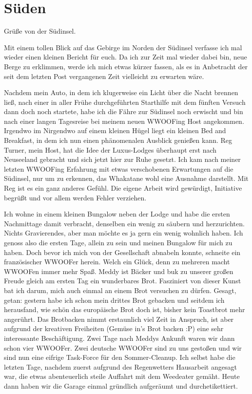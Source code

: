 \chapter{S\"uden}

Grüße von der Südinsel.

Mit einem tollen Blick auf das Gebirge im Norden der Südinsel verfasse
ich mal wieder einen kleinen Bericht für euch. Da ich zur Zeit mal
wieder dabei bin, neue Berge zu erklimmen, werde ich mich etwas kürzer
fassen, als es in Anbetracht der seit dem letzten Post vergangenen Zeit
vielleicht zu erwarten wäre.

Nachdem mein Auto, in dem ich klugerweise ein Licht über die Nacht
brennen ließ, nach einer in aller Frühe durchgeführten Starthilfe mit
dem fünften Versuch dann doch noch startete, habe ich die Fähre zur
Südinsel noch erwischt und bin nach einer langen Tagesreise bei meinem
neuen WWOOFing Host angekommen. Irgendwo im Nirgendwo auf einem kleinen
Hügel liegt ein kleinen Bed and Breakfast, in dem ich nun einen
phänomenalen Ausblick genießen kann. Reg Turner, mein Host, hat die Idee
der Luxus-Lodges überhaupt erst nach Neuseeland gebracht und sich jetzt
hier zur Ruhe gesetzt. Ich kam nach meiner letzten WWOOFing Erfahrung
mit etwas verschobenen Erwartungen auf die Südinsel, nur um zu erkennen,
das Whakatane wohl eine Ausnahme darstellt. Mit Reg ist es ein ganz
anderes Gefühl. Die eigene Arbeit wird gewürdigt, Initiative begrüßt und
vor allem werden Fehler verziehen.

Ich wohne in einem kleinen Bungalow neben der Lodge und habe die ersten
Nachmittage damit verbracht, denselben ein wenig zu säubern und
herzurichten. Nichts Gravierendes, aber man möchte es ja gern ein wenig
wohnlich haben. Ich genoss also die ersten Tage, allein zu sein und
meinen Bungalow für mich zu haben. Doch bevor ich mich von der
Gesellschaft abnabeln konnte, schneite ein französischer WWOOFer herein.
Welch ein Glück, denn zu mehreren macht WWOOFen immer mehr Spaß. Meddy
ist Bäcker und buk zu unserer großen Freude gleich am ersten Tag ein
wunderbares Brot. Fasziniert von dieser Kunst bat ich darum, mich auch
einmal an einem Brot versuchen zu dürfen. Gesagt, getan: gestern habe
ich schon mein drittes Brot gebacken und seitdem ich herausfand, wie
schön das europäische Brot doch ist, bisher kein Toastbrot mehr
angerührt. Das Brotbacken nimmt erstaunlich viel Zeit in Anspruch, ist
aber aufgrund der kreativen Freiheiten (Gemüse in's Brot backen :P) eine
sehr interessante Beschäftigung. Zwei Tage nach Meddys Ankunft waren wir
dann schon vier WWOOFer. Zwei deutsche WWOOFer sind zu uns gestoßen und
wir sind nun eine eifrige Task-Force für den Sommer-Cleanup. Ich selbst
habe die letzten Tage, nachdem zuerst aufgrund des Regenwetters
Hausarbeit angesagt war, die etwas abenteuerlich steile Auffahrt mit dem
Weedeater gemäht. Heute dann haben wir die Garage einmal gründlich
aufgeräumt und durchetikettiert.

